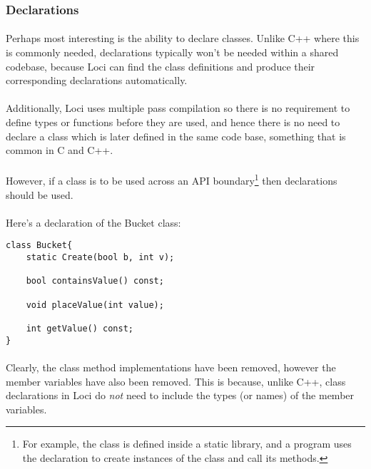 \documentclass[12pt,twoside,notitlepage]{report}
\begin{document}
\subsubsection{Declarations}

\paragraph{}
Perhaps most interesting is the ability to declare classes. Unlike C++ where this is commonly needed, declarations typically won't be needed within a shared codebase, because Loci can find the class definitions and produce their corresponding declarations automatically.

\paragraph{}
Additionally, Loci uses multiple pass compilation so there is no requirement to define types or functions before they are used, and hence there is no need to declare a class which is later defined in the same code base, something that is common in C and C++.

\paragraph{}
However, if a class is to be used across an API boundary\footnote{For example, the class is defined inside a static library, and a program uses the declaration to create instances of the class and call its methods.} then declarations should be used.

\paragraph{}
Here's a declaration of the Bucket class:


\begin{lstlisting}
class Bucket{
	static Create(bool b, int v);

	bool containsValue() const;
	
	void placeValue(int value);
	
	int getValue() const;
}
\end{lstlisting}


\paragraph{}
Clearly, the class method implementations have been removed, however the member variables have also been removed. This is because, unlike C++, class declarations in Loci do \emph{not} need to include the types (or names) of the member variables.
\end{document}
